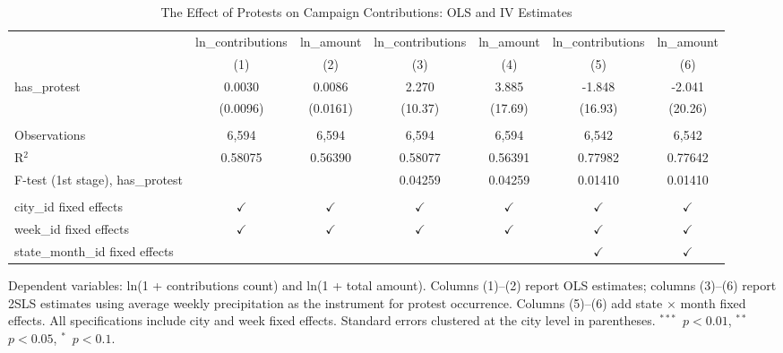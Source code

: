 
\begin{table}[htbp]
   \caption{\label{tab:main} The Effect of Protests on Campaign Contributions: OLS and IV Estimates}
   \bigskip
   \centering
   \footnotesize
   \begin{adjustbox}{max width=\textwidth}
   \begin{tabular}{lcccccc}
      \toprule
                                        & ln\_contributions  & ln\_amount    & ln\_contributions  & ln\_amount    & ln\_contributions  & ln\_amount\\   
                                        & (1)                & (2)           & (3)                & (4)           & (5)                & (6)\\  
      \midrule 
      has\_protest                      & 0.0030             & 0.0086        & 2.270              & 3.885         & -1.848             & -2.041\\   
                                        & (0.0096)           & (0.0161)      & (10.37)            & (17.69)       & (16.93)            & (20.26)\\   
       \\
      Observations                      & 6,594              & 6,594         & 6,594              & 6,594         & 6,542              & 6,542\\  
      R$^2$                             & 0.58075            & 0.56390       & 0.58077            & 0.56391       & 0.77982            & 0.77642\\  
      F-test (1st stage), has\_protest  &                    &               & 0.04259            & 0.04259       & 0.01410            & 0.01410\\  
       \\
      city\_id fixed effects            & $\checkmark$       & $\checkmark$  & $\checkmark$       & $\checkmark$  & $\checkmark$       & $\checkmark$\\   
      week\_id fixed effects            & $\checkmark$       & $\checkmark$  & $\checkmark$       & $\checkmark$  & $\checkmark$       & $\checkmark$\\   
      state\_month\_id fixed effects    &                    &               &                    &               & $\checkmark$       & $\checkmark$\\   
      \bottomrule
   \end{tabular}
   \end{adjustbox}

   \par \raggedright 
   Dependent variables: ln(1 + contributions count) and ln(1 + total amount). Columns (1)--(2) report OLS estimates; columns (3)--(6) report 2SLS estimates using average weekly precipitation as the instrument for protest occurrence. Columns (5)--(6) add state $\times$ month fixed effects. All specifications include city and week fixed effects. Standard errors clustered at the city level in parentheses. $^{***}$~$p<0.01$, $^{**}$~$p<0.05$, $^{*}$~$p<0.1$.
\end{table}


